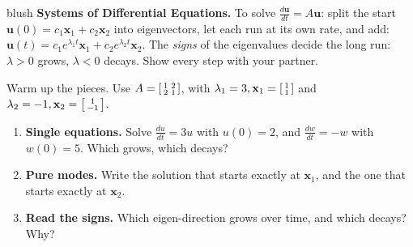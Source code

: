 \documentclass[10pt]{article}
\newcommand{\uu}{\mathbf{u}}
\newcommand{\xx}{\mathbf{x}}
\begin{document}
\namepartnerperiod

\vspace{0.10in}

\begin{headlinebox}{blush}
\small\textbf{Systems of Differential Equations.} To solve $\frac{d\uu}{dt}=A\uu$: split the start
$\uu(0)=c_1\xx_1+c_2\xx_2$ into eigenvectors, let each run at its own rate, and add:
$\uu(t)=c_1e^{\lambda_1 t}\xx_1+c_2e^{\lambda_2 t}\xx_2$. The \emph{signs} of the eigenvalues decide the long
run: $\lambda>0$ grows, $\lambda<0$ decays. Show every step with your partner.
\end{headlinebox}

\vspace{0.08in}

\begin{tcolorbox}[colback=white, colframe=black!40, title=\textbf{Tier R --- Remediate},
    fonttitle=\bfseries, arc=1.5mm, left=3mm, right=3mm, top=2mm, bottom=2mm, breakable]
Warm up the pieces. Use $A=\begin{bsmallmatrix} 1 & 2\\ 2 & 1 \end{bsmallmatrix}$, with
$\lambda_1=3,\xx_1=\begin{bsmallmatrix}1\\1\end{bsmallmatrix}$ and $\lambda_2=-1,\xx_2=\begin{bsmallmatrix}1\\-1\end{bsmallmatrix}$.
\begin{enumerate}[leftmargin=1.7em, itemsep=9pt]
  \item \textbf{Single equations.} Solve $\frac{du}{dt}=3u$ with $u(0)=2$, and $\frac{dw}{dt}=-w$ with $w(0)=5$. Which grows, which decays? \writeline
  \item \textbf{Pure modes.} Write the solution that starts exactly at $\xx_1$, and the one that starts exactly at $\xx_2$. \writeline
  \item \textbf{Read the signs.} Which eigen-direction grows over time, and which decays? Why? \writeline
\end{enumerate}
\end{tcolorbox}
\end{document}
